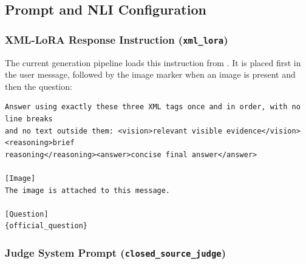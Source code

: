 \subsection{Prompt and NLI Configuration}
\label{subsec:appendix_prompts}

\subsubsection{XML-LoRA Response Instruction (\texttt{xml\_lora})}

The current generation pipeline loads this instruction from . It is placed first in the user message, followed by the image marker when an image is present and then the question:

\begin{promptblock}
\begin{lstlisting}
Answer using exactly these three XML tags once and in order, with no line breaks
and no text outside them: <vision>relevant visible evidence</vision><reasoning>brief
reasoning</reasoning><answer>concise final answer</answer>

[Image]
The image is attached to this message.

[Question]
{official_question}
\end{lstlisting}
\end{promptblock}

\subsubsection{Judge System Prompt (\texttt{closed\_source\_judge})}

